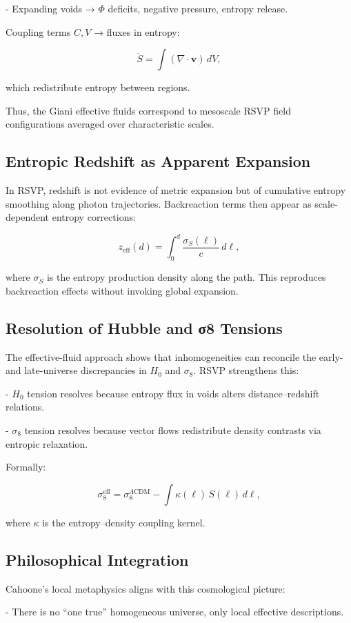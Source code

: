 \documentclass[12pt]{book}
\begin{document}
- Expanding voids → \( \Phi \) deficits, negative pressure, entropy release.

Coupling terms \( C, V \) → fluxes in entropy:

\[ \dot{S} = \int (\nabla \cdot \mathbf{v}) \, dV, \]

which redistribute entropy between regions.

Thus, the Giani effective fluids correspond to mesoscale RSVP field configurations averaged over characteristic scales.

\subsection{Entropic Redshift as Apparent Expansion}
In RSVP, redshift is not evidence of metric expansion but of cumulative entropy smoothing along photon trajectories. Backreaction terms then appear as scale-dependent entropy corrections:

\[ z_{\text{eff}}(d) = \int_0^d \frac{\sigma_S(\ell)}{c} \, d\ell, \]

where \( \sigma_S \) is the entropy production density along the path. This reproduces backreaction effects without invoking global expansion.

\subsection{Resolution of Hubble and σ8 Tensions}
The effective-fluid approach shows that inhomogeneities can reconcile the early- and late-universe discrepancies in \( H_0 \) and \( \sigma_8 \). RSVP strengthens this:

- \( H_0 \) tension resolves because entropy flux in voids alters distance–redshift relations.

- \( \sigma_8 \) tension resolves because vector flows redistribute density contrasts via entropic relaxation.

Formally:

\[ \sigma_8^{\text{eff}} = \sigma_8^{\Lambda \text{CDM}} - \int \kappa(\ell) \, S(\ell) \, d\ell, \]

where \( \kappa \) is the entropy–density coupling kernel.

\subsection{Philosophical Integration}
Cahoone’s local metaphysics aligns with this cosmological picture:

- There is no “one true” homogeneous universe, only local effective descriptions.
\end{document}
